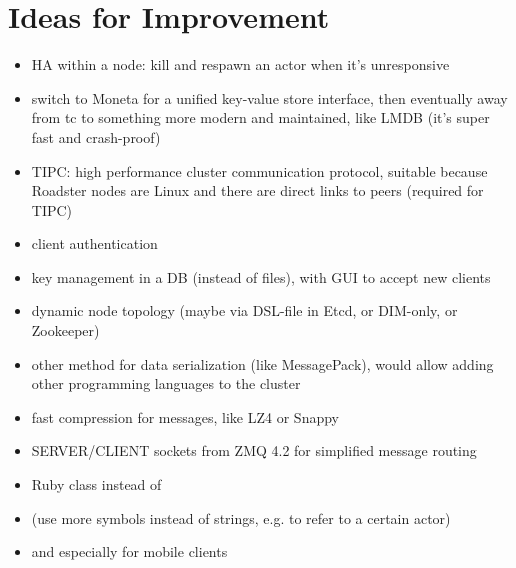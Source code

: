 \section{Ideas for Improvement}
\begin{itemize}
	\item HA within a node: kill and respawn an actor when it's unresponsive
	\item switch to Moneta for a unified key-value store interface, then eventually away from \gls{tc} to something more modern and maintained, like LMDB (it's super fast and crash-proof)
	\item TIPC: high performance cluster communication protocol, suitable because Roadster nodes are Linux and there are direct links to peers (required for TIPC)
	\item client authentication
	\item key management in a DB (instead of files), with GUI to accept new clients
	\item dynamic node topology (maybe via DSL-file in Etcd, or DIM-only, or Zookeeper)
	\item other method for data serialization (like MessagePack), would allow adding other programming languages to the cluster
	\item fast compression for messages, like LZ4 or Snappy
	\item SERVER/CLIENT sockets from ZMQ 4.2 for simplified message routing
	\item Ruby  class instead of 
	\item (use more symbols instead of strings, e.g. to refer to a certain actor)
	\item {} and  especially for mobile clients
\end{itemize}
